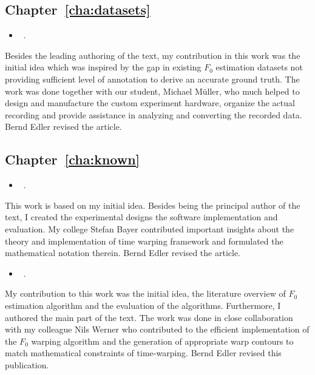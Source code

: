 \subsection*{Chapter~\ref{cha:datasets}}

\begin{itemize}
  \item[\cite{stoeter15acm}] ~.
\end{itemize}
\noindent
Besides the leading authoring of the text, my contribution in this work was the initial idea which was inspired by the gap in existing $F_0$ estimation datasets not providing sufficient level of annotation to derive an accurate ground truth.
The work was done together with our student, Michael Müller, who much helped to design and manufacture the custom experiment hardware, organize the actual recording and provide assistance in analyzing and converting the recorded data. Bernd Edler revised the article.

\subsection*{Chapter~\ref{cha:known}}

\begin{itemize}
  \item[\cite{stoeter14}] ~.
\end{itemize}
\noindent
This work is based on my initial idea. Besides being the principal author of the text, I created the experimental designs the software implementation and evaluation.
My college Stefan Bayer contributed important insights about the theory and implementation of time warping framework and formulated the mathematical notation therein. Bernd Edler revised the article.

\begin{itemize}
  \item[\cite{stoeter15icassp}] ~.
\end{itemize}
\noindent
My contribution to this work was the initial idea, the literature overview of $F_0$ estimation algorithm and the evaluation of the algorithms. 
Furthermore, I authored the main part of the text.
The work was done in close collaboration with my colleague Nils Werner who contributed to the efficient implementation of the $F_0$ warping algorithm and the generation of appropriate warp contours to match mathematical constraints of time-warping. Bernd Edler revised this publication.

